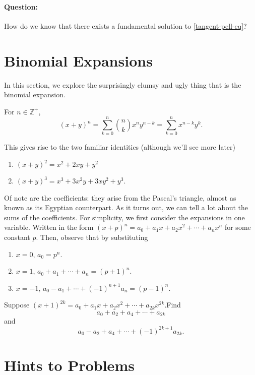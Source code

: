 \documentclass[../jarvis.tex]{subfiles}
\begin{document}
\paragraph{Question:} How do we know that there exists a fundamental solution to \eqref{tangent-pell-eq}?

\section{Binomial Expansions}
In this section, we explore the surprisingly clumsy and ugly thing that is the binomial expansion.

\begin{proposition}
    For $n\in \mathbb{Z^+}$,
    $$(x+y)^n=\sum_{k=0}^n\binom{n}{k}x^ny^{n-k}=\sum_{k=0}^nx^{n-k}y^k.$$
\end{proposition}
This gives rise to the two familiar identities (although we'll see more later)
\begin{enumerate}
    \item $(x+y)^2=x^2+2xy+y^2$
    \item $(x+y)^3=x^3+3x^2y+3xy^2+y^3$.
\end{enumerate}
Of note are the coefficients: they arise from the Pascal's triangle, almost as known as its Egyptian counterpart. As it turns out, we can tell a lot about the sums of the coefficients. For simplicity, we first consider the expansions in one variable. Written in the form
$(x+p)^n=a_0+a_1x+a_2x^2+\cdots+a_nx^n$ for some constant $p$. Then, observe that by substituting
\begin{enumerate}
    \item $x=0$, $a_0=p^n$.
    \item $x=1$, $a_0+a_1+\cdots+a_n=(p+1)^n$.
    \item $x=-1$, $a_0-a_1+\cdots+(-1)^{n+1}a_n=(p-1)^n$.
\end{enumerate}
\problem Suppose $(x+1)^{2k}=a_0+a_1x+a_2x^2+\cdots+a_{2k}x^{2k}$.Find $$a_0+a_2+a_4+\cdots+a_{2k}$$ and $$a_0-a_2+a_4+\cdots+(-1)^{2k+1}a_{2k}.$$

\section{Hints to Problems}
\printhint
\end{document}
